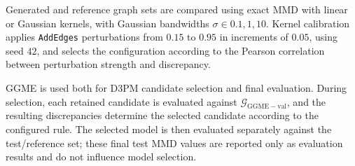 Generated and reference graph sets are compared using exact MMD with linear or Gaussian kernels, with Gaussian bandwidths \(\sigma\in{0.1,1,10}\). Kernel calibration applies \texttt{AddEdges} perturbations from \(0.15\) to \(0.95\) in increments of \(0.05\), using seed \(42\), and selects the configuration according to the Pearson correlation between perturbation strength and discrepancy.

GGME is used both for D3PM candidate selection and final evaluation. During selection, each retained candidate is evaluated against \(\mathcal{G}_{\mathrm{GGME-val}}\), and the resulting discrepancies determine the selected candidate according to the configured rule. The selected model is then evaluated separately against the test/reference set; these final test MMD values are reported only as evaluation results and do not influence model selection.
